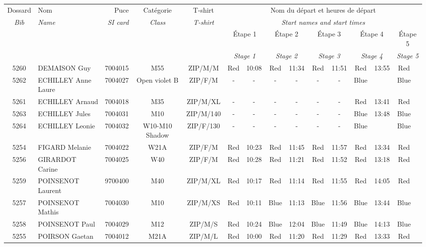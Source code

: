 \documentclass{report}
\begin{document}
  \begin{longtable}{|c|l|r|c|c|*{5}{cc|}}
    Dossard & Nom  & Puce    & Catégorie & T-shirt & \multicolumn{10}{c|}{Nom du départ et heures de départ} \\
    \itshape Bib     & \itshape Name & \itshape SI card & \itshape Class  & \itshape  T-shirt  & \multicolumn{10}{c|}{\itshape Start names and start times} \\
    \hline
    & & & & & \multicolumn{2}{c|}{Étape 1} & \multicolumn{2}{c|}{Étape 2} & \multicolumn{2}{c|}{Étape 3} & \multicolumn{2}{c|}{Étape 4} & \multicolumn{2}{c|}{Étape 5} \\
    & & & & & \multicolumn{2}{c|}{\itshape Stage 1} & \multicolumn{2}{c|}{\itshape Stage 2} & \multicolumn{2}{c|}{\itshape Stage 3} & \multicolumn{2}{c|}{\itshape Stage 4} & \multicolumn{2}{c|}{\itshape Stage 5} \\
    \hline
    5260 & DEMAISON Guy & 7004015 & M55 & ZIP/M/M & Red & 10:08 & Red & 11:34 & Red & 11:51 & Red & 13:55 & Red &  \\
    5262 & ECHILLEY Anne Laure & 7004027 & Open violet B & ZIP/F/M & - &  - & - &  - & - &  - & Blue &   & Blue &  \\
    5261 & ECHILLEY Arnaud & 7004018 & M35 & ZIP/M/XL & - &  - & - &  - & - &  - & Red & 13:41 & Red &  \\
    5263 & ECHILLEY Jules & 7004031 & M10 & ZIP/M/140 & - &  - & - &  - & - &  - & Blue & 13:48 & Blue &  \\
    5264 & ECHILLEY Leonie & 7004032 & W10-M10 Shadow & ZIP/F/130 & - &  - & - &  - & - &  - & Blue &   & Blue &  \\
    5254 & FIGARD Melanie & 7004022 & W21A & ZIP/F/M & Red & 10:23 & Red & 11:45 & Red & 11:57 & Red & 13:34 & Red &  \\
    5256 & GIRARDOT Carine & 7004025 & W40 & ZIP/F/M & Red & 10:28 & Red & 11:21 & Red & 11:52 & Red & 13:18 & Red &  \\
    5259 & POINSENOT Laurent & 9700400 & M40 & ZIP/M/XL & Red & 10:17 & Red & 11:14 & Red & 11:55 & Red & 14:05 & Red &  \\
    5257 & POINSENOT Mathis & 7004030 & M10 & ZIP/M/XS & Red & 10:11 & Blue & 11:13 & Blue & 11:56 & Blue & 13:44 & Blue &  \\
    5258 & POINSENOT Paul & 7004029 & M12 & ZIP/M/S & Red & 10:24 & Blue & 12:04 & Blue & 11:49 & Blue & 14:13 & Blue &  \\
    5255 & POIRSON Gaetan & 7004012 & M21A & ZIP/M/L & Red & 10:00 & Red & 11:20 & Red & 11:29 & Red & 13:33 & Red &  \\

\end{longtable}
\end{document}

